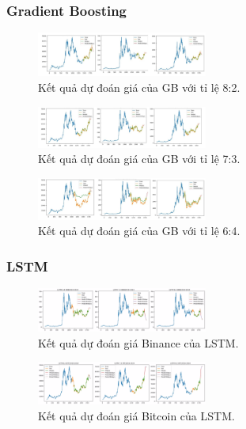 \documentclass[conference]{IEEEtran}
\begin{document}
\subsubsection{Gradient Boosting}
\begin{figure}[H]
    \centering
    \includegraphics[width=0.5\textwidth]{bibliography/pictures/GB_82.jpg}
    \caption{Kết quả dự đoán giá của GB với tỉ lệ 8:2.}
\end{figure}
\begin{figure}[H]
    \centering
    \includegraphics[width=0.5\textwidth]{bibliography/pictures/GB_73.jpg}
    \caption{Kết quả dự đoán giá của GB với tỉ lệ 7:3.}
\end{figure}
\begin{figure}[H]
    \centering
    \includegraphics[width=0.5\textwidth]{bibliography/pictures/GB_64.jpg}
    \caption{Kết quả dự đoán giá của GB với tỉ lệ 6:4.}
\end{figure}
\subsubsection{LSTM}

\begin{figure}[H]
    \centering
    \includegraphics[width=0.5\textwidth]{bibliography/pictures/LSTM BNB.jpg}
    \caption{Kết quả dự đoán giá Binance của LSTM.}
\end{figure}

\begin{figure}[H]
    \centering
    \includegraphics[width=0.5\textwidth]{bibliography/pictures/LSTM BTC.jpg}
    \caption{Kết quả dự đoán giá Bitcoin của LSTM.}
\end{figure}
\end{document}
